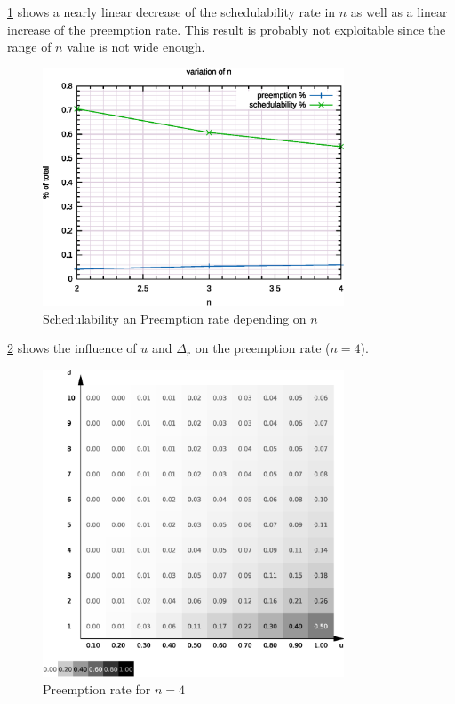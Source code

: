 \documentclass[a4paper,12pt]{article}
\begin{document}
\ref{fig:stu:an} shows a nearly linear decrease of the schedulability rate in $n$ as well as a linear increase of the preemption rate. This result is probably not exploitable since the range of $n$ value is not wide enough.

\begin{figure}
	\centering
	\includegraphics[width=0.8\textwidth]{../gnuplot/eps/3}
	\caption{\label{fig:stu:an} Schedulability an Preemption rate depending on $n$}
\end{figure}

\ref{fig:stu:4p} shows the influence of $u$ and $\Delta_r$ on the preemption rate ($n = 4$).

\begin{figure}
	\centering
	\includegraphics[width=0.8\textwidth]{../mean/eps/4p}
	\caption{\label{fig:stu:4p} Preemption rate for $n = 4$}
\end{figure}
\end{document}
